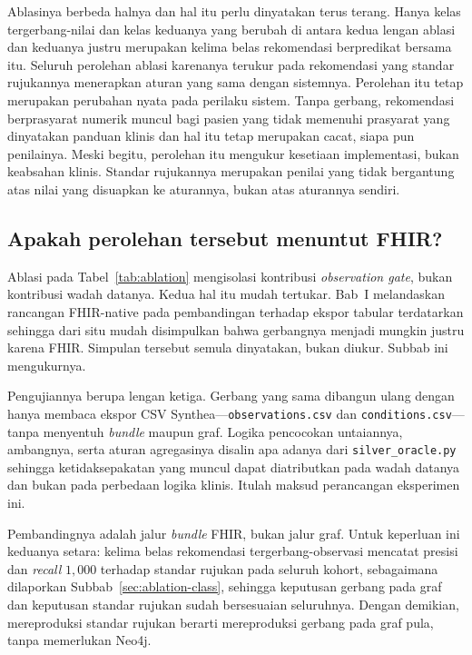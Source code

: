 Ablasinya berbeda halnya dan hal itu perlu dinyatakan terus terang. Hanya kelas
tergerbang-nilai dan kelas keduanya yang berubah di antara kedua lengan ablasi dan keduanya
justru merupakan kelima belas rekomendasi berpredikat bersama itu. Seluruh perolehan ablasi
karenanya terukur pada rekomendasi yang standar rujukannya menerapkan aturan yang sama dengan
sistemnya. Perolehan itu tetap merupakan perubahan nyata pada perilaku sistem. Tanpa gerbang,
rekomendasi berprasyarat numerik muncul bagi pasien yang tidak memenuhi prasyarat yang
dinyatakan panduan klinis dan hal itu tetap merupakan cacat, siapa pun penilainya. Meski
begitu, perolehan itu mengukur kesetiaan implementasi, bukan keabsahan klinis. Standar rujukannya merupakan
penilai yang tidak bergantung atas nilai yang disuapkan ke aturannya, bukan atas aturannya
sendiri.

\subsection{Apakah perolehan tersebut menuntut FHIR?}
\label{sec:csv-gating}
Ablasi pada Tabel~\ref{tab:ablation} mengisolasi kontribusi \emph{observation gate}, bukan
kontribusi wadah datanya. Kedua hal itu mudah tertukar. Bab~I melandaskan rancangan FHIR-native
pada pembandingan terhadap ekspor tabular terdatarkan sehingga dari situ mudah disimpulkan
bahwa gerbangnya menjadi mungkin justru karena FHIR. Simpulan tersebut semula dinyatakan, bukan
diukur. Subbab ini mengukurnya.

Pengujiannya berupa lengan ketiga. Gerbang yang sama dibangun ulang dengan hanya membaca ekspor
CSV Synthea---\texttt{observations.csv} dan \texttt{conditions.csv}---tanpa menyentuh
\emph{bundle} maupun graf. Logika pencocokan untaiannya, ambangnya, serta aturan agregasinya
disalin apa adanya dari \texttt{silver\_oracle.py} sehingga ketidaksepakatan yang muncul dapat
diatributkan pada wadah datanya dan bukan pada perbedaan logika klinis. Itulah maksud
perancangan eksperimen ini.

Pembandingnya adalah jalur \emph{bundle} FHIR, bukan jalur graf. Untuk keperluan ini keduanya
setara: kelima belas rekomendasi tergerbang-observasi mencatat presisi dan \emph{recall}
$1{,}000$ terhadap standar rujukan pada seluruh kohort, sebagaimana dilaporkan
Subbab~\ref{sec:ablation-class}, sehingga keputusan gerbang pada graf dan keputusan standar
rujukan sudah bersesuaian seluruhnya. Dengan demikian, mereproduksi standar rujukan berarti
mereproduksi gerbang pada graf pula, tanpa memerlukan Neo4j.

